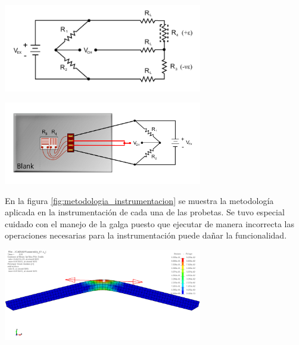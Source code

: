 \begin{center}
\includegraphics[width=0.65\textwidth]{src/ch3/circuito_conexion.pdf}
\label{fig:circuito_conexion}
\end{center}

\begin{center}
\includegraphics[width=0.65\textwidth]{src/ch3/diagrama_conexion.pdf}
\label{fig:diagrama_conexion}
\end{center}

En la figura \ref{fig:metodologia_instrumentacion} se muestra la metodología aplicada 
en la instrumentación de cada una de las probetas. Se tuvo especial cuidado con el 
manejo de la galga puesto que ejecutar de manera incorrecta las operaciones necesarias 
para la instrumentación puede dañar la funcionalidad. \\

\begin{center}
\includegraphics[width=0.65\textwidth]{src/ch3/dir_prin_strain.png}
\label{fig:dir_prin_strain}
\end{center}


